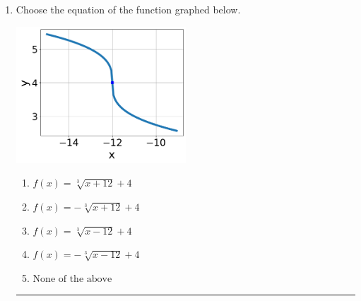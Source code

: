 \documentclass[14pt]{extbook}
\newcommand{\litem}[1]{\item#1\hspace*{-1cm}\rule{\textwidth}{0.4pt}}
\begin{document}
\begin{enumerate}
{\begin{enumerate}[label=\Alph*.]
\end{enumerate} }
\litem{
Choose the equation of the function graphed below.
\begin{center}
    \includegraphics[width=0.5\textwidth]{../Figures/radicalGraphToEquationCopyC.png}
\end{center}
\begin{enumerate}[label=\Alph*.]
\item \( f(x) = \sqrt[3]{x + 12} + 4 \)
\item \( f(x) = - \sqrt[3]{x + 12} + 4 \)
\item \( f(x) = \sqrt[3]{x - 12} + 4 \)
\item \( f(x) = - \sqrt[3]{x - 12} + 4 \)
\item \( \text{None of the above} \)


\end{enumerate}}
\end{enumerate}
\end{document}
